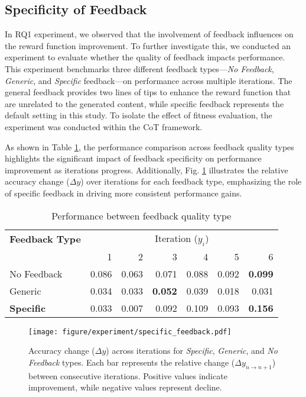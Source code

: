 \subsection{Specificity of Feedback}  
\label{sec:specificity_feedback}

In RQ1 experiment, we observed that the involvement of feedback influences on the reward function improvement. 
To further investigate this, we conducted an experiment to evaluate whether the quality of feedback impacts performance. 
This experiment benchmarks three different feedback types—\textit{No Feedback}, \textit{Generic}, and \textit{Specific} feedback—on performance across multiple iterations.
The general feedback provides two lines of tips to enhance the reward function that are unrelated to the generated content, while specific feedback represents the default setting in this study.
To isolate the effect of fitness evaluation, the experiment was conducted within the CoT framework.

As shown in Table \ref{tab:feedback_type}, the performance comparison across feedback quality types highlights the significant impact of feedback specificity on performance improvement as iterations progress. 
Additionally, Fig. \ref{fig:specific_feedback} illustrates the relative accuracy change ($\Delta y$) over iterations for each feedback type, emphasizing the role of specific feedback in driving more consistent performance gains.


\begin{table}[!h]
\caption{Performance between feedback quality type}
\label{tab:feedback_type}
\begin{tabular}{l|rrrrrr}
\toprule
\textbf{Feedback Type} & \multicolumn{6}{c}{Iteration ($y_{i}$)} \\
 & 1 & 2 & 3 & 4 & 5 & 6 \\
\midrule
No Feedback & 0.086 & 0.063 & 0.071 & 0.088 & 0.092 & \textbf{0.099} \\
Generic & 0.034 & 0.033 & \textbf{0.052} & 0.039 & 0.018 & 0.031 \\
\textbf{Specific} & 0.033 & 0.007 & 0.092 & 0.109 & 0.093 & \textbf{0.156} \\
\bottomrule
\end{tabular}
\end{table}


\begin{figure}[!h]
    \centering
    \texttt{[image: figure/experiment/specific\_feedback.pdf]}
    \caption{Accuracy change ($\Delta y$) across iterations for \textit{Specific}, \textit{Generic}, and \textit{No Feedback} types. Each bar represents the relative change ($\Delta y_{n \to n+1}$) between consecutive iterations. Positive values indicate improvement, while negative values represent decline.}
    \label{fig:specific_feedback}
\end{figure}

